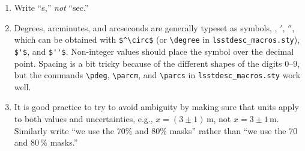 \documentclass[letterpaper,11pt]{article}
\begin{document}
\begin{enumerate}
\item Write ``s,'' {\it not\/} ``sec.''


\item Degrees, arcminutes, and arcseconds are generally typeset as symbols,
\degree, $'$, $''$, which can be obtained with \verb|$^\circ$| (or \verb|\degree| in {\tt lsstdesc\_macros.sty}), \verb|$'$|, and \verb|$''$|. Non-integer values should place the symbol over the
decimal point.  Spacing is a bit tricky because of the different shapes of the
digits 0--9, but the commands \verb|\pdeg|, \verb|\parcm|, and \verb|\parcs| in {\tt lsstdesc\_macros.sty}
work well.  



\item It is good practice to try to avoid ambiguity by making sure that units
apply to both values and uncertainties, e.g., $x=(3\pm1)\,$m, not $x=3\pm1\,$m.
 Similarly write ``we use the 70\% and 80\% masks'' rather than ``we use
the 70 and 80\,\% masks.''





\end{enumerate}
\end{document}
